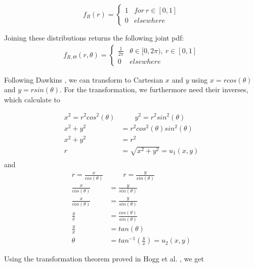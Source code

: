 \begin{equation}
f_R(r) = 
\begin{cases} 
      1 & for~r\in[0,1]\\
      0&elsewhere
   \end{cases}
\label{eq:r_untransformed}
\end{equation}

Joining these distributions returns the following joint pdf:
\begin{equation}
\begin{split}
f_{R,\Theta}(r,\theta) = 
\begin{cases} 
      \frac{1}{2\pi} & \theta \in [0,2\pi),~ r\in[0,1]\\
      0&elsewhere
   \end{cases}
\end{split}
\label{eq:joint_pdf_untransformed}
\end{equation}

Following Dawkins \cite{dawkins}, we can transform to Cartesian $x$ and $y$ using $x = rcos(\theta)$ and $y=rsin(\theta)$. For the transformation, we furthermore need their inverses, which calculate to 

\begin{align*}
x^2=r^2cos^2(\theta)& \qquad y^2=r^2sin^2(\theta)\\
x^2+y^2&=r^2cos^2(\theta)sin^2(\theta)\\
x^2+y^2&=r^2\\
r &= \sqrt{x^2+y^2} = u_1(x,y)\\
\label{eq:r^-1}
\end{align*}
and
\begin{align*}
 r = \frac{x}{cos(\theta)}& \qquad r = \frac{y}{sin(\theta)}\\
 \frac{x}{cos(\theta)} &= \frac{y}{sin(\theta)}\\
 \frac{x}{cos(\theta)} &= \frac{y}{sin(\theta)}\\
 \frac{y}{x} &= \frac{cos(\theta)}{sin(\theta)}\\
 \frac{y}{x} &= tan(\theta)\\
 \theta &= tan^{-1}(\frac{y}{x}) = u_2(x,y)
\label{eq:theta^-1}
\end{align*}

Using the transformation theorem proved in Hogg et al. \cite[Chapter~2.7]{hogg}, we get
 
